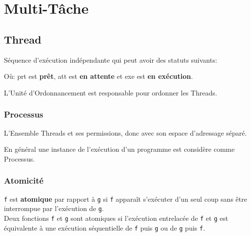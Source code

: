 \documentclass{article}
\begin{document}
\section{Multi-Tâche}

\subsection{Thread}
\begin{definition}
    Séquence d'exécution indépendante qui peut avoir des statuts suivants:
    \begin{figure}[H]
        \centering
    \end{figure}
    Où: prt est \textbf{prêt}, att est \textbf{en attente} et exe est \textbf{en exécution}.
    
    \begin{remark}
        L'Unité d'Ordonnancement est responsable pour ordonner les Threads.
    \end{remark}
\end{definition}

\subsubsection{Processus}
\begin{definition}
    L'Ensemble Threads et ses permissions, donc avec son espace d'adressage séparé.

    \begin{remark}
        En général une instance de l'exécution d'un programme est considère comme Processus.
    \end{remark}
\end{definition}

\subsubsection{Atomicité}
\begin{definition}
    \texttt{f} est \textbf{atomique} par rapport à \texttt{g} si \texttt{f} apparaît s'exécuter d'un seul coup sans être interrompue par l'exécution de \texttt{g}.\\

    Deux fonctions \texttt{f} et \texttt{g} sont atomiques si l'exécution entrelacée de \texttt{f} et \texttt{g} est équivalente à une exécution séquentielle de \texttt{f} puis \texttt{g} ou de \texttt{g} puis \texttt{f}.
\end{definition}
\end{document}
